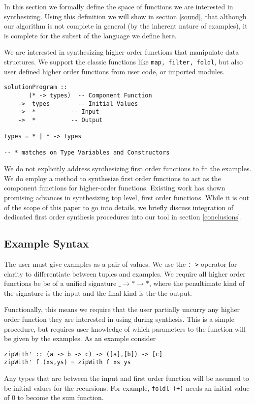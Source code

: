 In this section we formally define the space of functions we are interested in synthesizing. Using this definition we will show in section \ref{sound}, that although our algorithm is not complete in general (by the inherent nature of examples), it is complete for the subset of the language we define here.

We are interested in synthesizing higher order functions that manipulate data structures. We support the classic functions like \texttt{map, filter, foldl}, but also user defined higher order functions from user code, or imported modules. 

\begin{lstlisting}
solutionProgram ::
       (* -> types)  -- Component Function
    ->  types        -- Initial Values
    ->  *          -- Input
    ->  *          -- Output

types = * | * -> types

-- * matches on Type Variables and Constructors
\end{lstlisting}

We do not explicitly address synthesizing first order functions to fit the examples. We do employ a method to synthesize first order functions to act as the component functions for higher-order functions. Existing work has shown promising advances in synthesizing top level, first order functions\cite{potential, reviewers}. While it is out of the scope of this paper to go into details, we briefly discuss integration of dedicated first order synthesis procedures into our tool in section \ref{conclusions}.


\subsection{Example Syntax}
The user must give examples as a pair of values. We use the \texttt{:->} operator for clarity to differentiate between tuples and examples.
We require all higher order functions be be of a unified signature \texttt{$\_ \to * \to *$}, where the penultimate kind of the signature is the input and the final kind is the the output.  

Functionally, this means we require that the user partially uncurry any higher order function they are interested in using during synthesis. This is a simple procedure, but requires user knowledge of which parameters to the function will be given by the examples. As an example consider 

\begin{lstlisting}
zipWith' :: (a -> b -> c) -> ([a],[b]) -> [c]
zipWith' f (xs,ys) = zipWith f xs ys
\end{lstlisting}

Any types that are between the input and first order function will be assumed to be initial values for the recursions. For example, \texttt{foldl (+)} needs an initial value of 0 to become the sum function.

